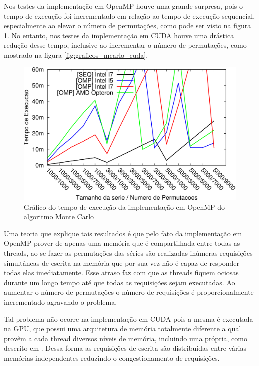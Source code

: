 Nos testes da implementação em OpenMP houve uma grande surpresa, pois o tempo de execução foi incrementado em relação ao tempo de execução sequencial, especialmente ao elevar o número de permutações, como pode ser visto na figura \ref{fig:grafico_mcarlo_omp}. No entanto, nos testes da implementação em CUDA houve uma drástica redução desse tempo, inclusive ao incrementar o número de permutações, como mostrado na figura \ref{fig:graficos_mcarlo_cuda}.

\begin{figure}[H]
\centering
\includegraphics[]{Imagens/graficos_mcarlo/mcarlo_omp.png}
\caption{Gráfico do tempo de execução da implementação em OpenMP do algoritmo Monte Carlo}
\label{fig:grafico_mcarlo_omp}
\end{figure}

Uma teoria que explique tais resultados é que pelo fato da implementação em OpenMP prover de apenas uma memória que é compartilhada entre todas as threads, ao se fazer as permutações das séries são realizadas inúmeras requisições simultâneas de escrita na memória que por sua vez não é capaz de responder todas elas imediatamente. Esse atraso faz com que as threads fiquem ociosas durante um longo tempo até que todas as requisições sejam executadas. Ao aumentar o número de permutações o número de requisições é proporcionalmente incrementado agravando o problema.

Tal problema não ocorre na implementação em CUDA pois a mesma é executada na GPU, que possui uma arquitetura de memória totalmente diferente a qual provêm a cada thread diversos níveis de memória, incluindo uma própria, como descrito em \cite{cuda_guide}. Dessa forma as requisições de escrita são distribuídas entre várias memórias independentes reduzindo o congestionamento de requisições.

